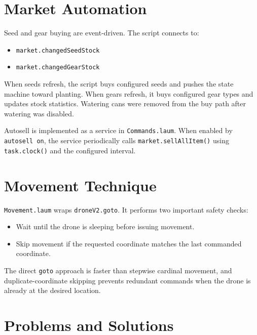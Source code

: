 \documentclass[11pt]{article}
\begin{document}
\section{Market Automation}

Seed and gear buying are event-driven. The script connects to:

\begin{itemize}
    \item \texttt{market.changedSeedStock}
    \item \texttt{market.changedGearStock}
\end{itemize}

When seeds refresh, the script buys configured seeds and pushes the state
machine toward planting. When gears refresh, it buys configured gear types and
updates stock statistics. Watering cans were removed from the buy path after
watering was disabled.

Autosell is implemented as a service in \texttt{Commands.laum}. When enabled
by \texttt{autosell on}, the service periodically calls
\texttt{market.sellAllItem()} using \texttt{task.clock()} and the configured
interval.

\section{Movement Technique}

\texttt{Movement.laum} wraps \texttt{droneV2.goto}. It performs two important
safety checks:

\begin{itemize}
    \item Wait until the drone is sleeping before issuing movement.
    \item Skip movement if the requested coordinate matches the last commanded coordinate.
\end{itemize}

The direct \texttt{goto} approach is faster than stepwise cardinal movement,
and duplicate-coordinate skipping prevents redundant commands when the drone is
already at the desired location.

\section{Problems and Solutions}
\end{document}
